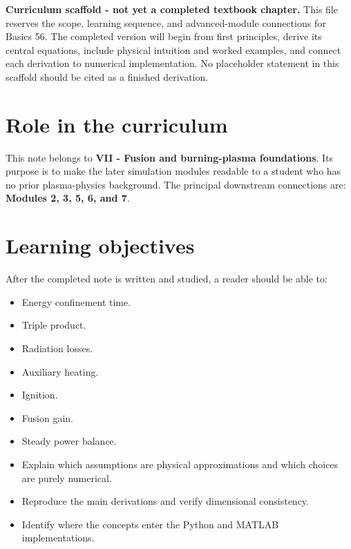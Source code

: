 \documentclass[11pt]{article}
\begin{document}

\begin{overviewbox}
\textbf{Curriculum scaffold - not yet a completed textbook chapter.} This file reserves the scope, learning sequence, and advanced-module connections for Basics 56. The completed version will begin from first principles, derive its central equations, include physical intuition and worked examples, and connect each derivation to numerical implementation. No placeholder statement in this scaffold should be cited as a finished derivation.
\end{overviewbox}

\ProjectTOC

\section{Role in the curriculum}
This note belongs to \textbf{VII - Fusion and burning-plasma foundations}. Its purpose is to make the later simulation modules readable to a student who has no prior plasma-physics background. The principal downstream connections are: \textbf{Modules 2, 3, 5, 6, and 7}.

\section{Learning objectives}
After the completed note is written and studied, a reader should be able to:
\begin{itemize}[leftmargin=1.6em]
\item Energy confinement time.
\item Triple product.
\item Radiation losses.
\item Auxiliary heating.
\item Ignition.
\item Fusion gain.
\item Steady power balance.
\item Explain which assumptions are physical approximations and which choices are purely numerical.
\item Reproduce the main derivations and verify dimensional consistency.
\item Identify where the concepts enter the Python and MATLAB implementations.
\end{itemize}
\end{document}
